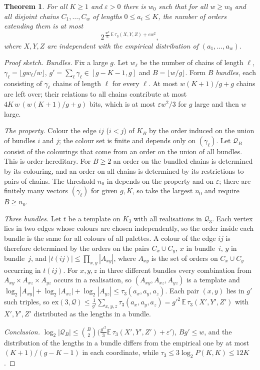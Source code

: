 \documentclass[11pt]{article}
\newtheorem{theorem}{Theorem}
\theoremstyle{definition}
\theoremstyle{remark}
\begin{document}
\begin{theorem}\label{thm:templates}
For all $K\ge1$ and $\varepsilon>0$ there is $w_0$ such that for all $w\ge w_0$ and all
disjoint chains $C_1,\dots,C_w$ of lengths $0\le a_i\le K$, the number of orders extending them is
at most
\[
 2^{\,\frac{w^2}{6}\,\mathbb{E}\,\tau_3(X,Y,Z)+\varepsilon w^2},
\]
where $X,Y,Z$ are independent with the empirical distribution of $(a_1,\dots,a_w)$.
\end{theorem}
\begin{proof}[Proof sketch]
\emph{Bundles.} Fix a large $g$. Let $w_\ell$ be the number of chains of length $\ell$,
$\gamma_\ell=\lfloor gw_\ell/w\rfloor$, $g'=\sum_\ell\gamma_\ell\in[g-K-1,g]$ and
$B=\lfloor w/g\rfloor$. Form $B$ \emph{bundles}, each consisting of $\gamma_\ell$ chains of
length $\ell$ for every $\ell$. At most $w(K+1)/g+g$ chains are left over; their relations
to all chains contribute at most $4K\,w\,(w(K+1)/g+g)$ bits, which is at most
$\varepsilon w^2/3$ for $g$ large and then $w$ large.

\emph{The property.} Colour the edge $ij$ ($i<j$) of $K_B$ by the order induced on the union
of bundles $i$ and $j$; the colour set is finite and depends only on $(\gamma_\ell)$.
Let $\mathcal Q_B$ consist of the colourings that come from an order on the union of all
bundles. This is order-hereditary. For $B\ge2$ an order on the bundled chains is determined by its colouring, and an order on
all chains is determined by its restrictions to pairs of chains. The threshold $n_0$ in
\cite[Cor.~2.15]{FOU} depends on the property and on $\varepsilon$; there are finitely many
vectors $(\gamma_\ell)$ for given $g,K$, so take the largest $n_0$ and require $B\ge n_0$.

\emph{Three bundles.} Let $t$ be a template on $K_3$ with all realisations in $\mathcal Q_3$.
Each vertex lies in two edges whose colours are chosen independently, so the order inside
each bundle is the same for all colours of all palettes. A colour of the edge $ij$ is
therefore determined by the orders on the pairs $C_x\cup C_y$, $x$ in bundle~$i$, $y$ in
bundle~$j$, and $|t(ij)|\le\prod_{x,y}|A_{xy}|$, where $A_{xy}$ is the set of orders on
$C_x\cup C_y$ occurring in $t(ij)$. For $x,y,z$ in three different bundles every
combination from $A_{xy}\times A_{xz}\times A_{yz}$ occurs in a realisation, so
$(A_{xy},A_{xz},A_{yz})$ is a template and
$\log_2|A_{xy}|+\log_2|A_{xz}|+\log_2|A_{yz}|\le\tau_3(a_x,a_y,a_z)$.
Each pair $(x,y)$ lies in $g'$ such triples, so
$\mathrm{ex}(3,\mathcal Q)\le\frac1{g'}\sum_{x,y,z}\tau_3(a_x,a_y,a_z)
=g'^2\,\mathbb{E}\,\tau_3(X',Y',Z')$ with $X',Y',Z'$ distributed as the lengths in a bundle.

\emph{Conclusion.} $\log_2|\mathcal Q_B|\le\binom B2\bigl(\tfrac{g'^2}{3}\mathbb{E}\,\tau_3(X',Y',Z')
+\varepsilon'\bigr)$, $Bg'\le w$, and the distribution of the lengths in a bundle differs
from the empirical one by at most $(K+1)/(g-K-1)$ in each coordinate, while
$\tau_3\le 3\log_2P(K,K)\le12K$.
\end{proof}
\end{document}
